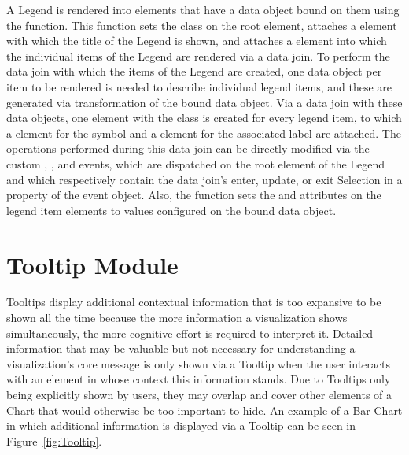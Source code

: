 A Legend is rendered into elements that have a  data object bound on them using the  function.
This function sets the  class on the root element, attaches a  element with which the title of the Legend is shown, and attaches a  element into which the individual items of the Legend are rendered via a data join.
To perform the data join with which the items of the Legend are created, one  data object per item to be rendered is needed to describe individual legend items, and these are generated via transformation of the bound  data object.
Via a data join with these data objects, one  element with the  class is created for every legend item, to which a  element for the symbol and a  element for the associated label are attached.
The operations performed during this data join can be directly modified via the custom , , and  events, which are dispatched on the root element of the Legend and which respectively contain the data join's enter, update, or exit Selection in a property of the event object.
Also, the  function sets the  and  attributes on the legend item elements to values configured on the bound  data object.

\section{Tooltip Module}
\label{sec:TooltipModule}

Tooltips display additional contextual information that is too expansive to be shown all the time because the more information a visualization shows simultaneously, the more cognitive effort is required to interpret it.
Detailed information that may be valuable but not necessary for understanding a visualization's core message is only shown via a Tooltip when the user interacts with an element in whose context this information stands.
Due to Tooltips only being explicitly shown by users, they may overlap and cover other elements of a Chart that would otherwise be too important to hide.
An example of a Bar Chart in which additional information is displayed via a Tooltip can be seen in Figure~\ref{fig:Tooltip}.

